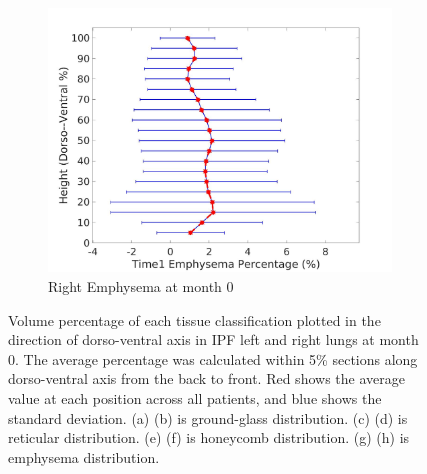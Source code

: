 \begin{figure}[H]
\begin{subfigure}{.42\linewidth}
  \includegraphics[width=\linewidth,trim={{.0\wd0} {.0\wd0} {.0\wd0} {.0\wd0}},clip]{QuantitativeAnalysis/Image/RightLungEmphysemaDiseaseDorsoToVentralTime1.jpg}
  \caption{Right Emphysema at month 0}
  \label{fig:DiseaseDorsoToVentralTime1-h}
\end{subfigure}
\caption{Volume percentage of each tissue classification plotted in the direction of dorso-ventral axis in IPF left and right lungs at month 0. The average percentage was calculated within 5\% sections along dorso-ventral axis from the back to front. Red shows the average value at each position across all patients, and blue shows the standard deviation. (a) (b) is ground-glass distribution. (c) (d) is reticular distribution. (e) (f) is honeycomb distribution. (g) (h) is emphysema distribution.}
\label{fig:DiseaseDorsoToVentralTime1}
\end{figure}

